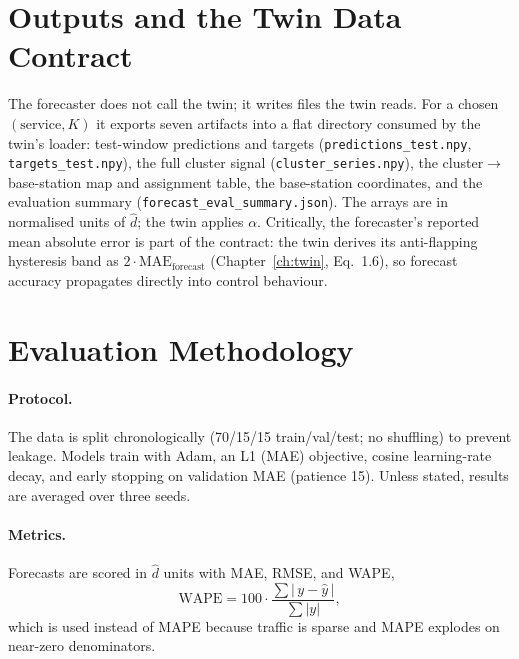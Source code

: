 \section{Outputs and the Twin Data Contract}
\label{sec:fc-contract}

{\sloppy The forecaster does not call the twin; it writes files the twin reads. For a chosen
$(\text{service},K)$ it exports seven artifacts into a flat directory consumed by the twin's
loader: test-window predictions and targets (\texttt{predictions\_test.npy},
\texttt{targets\_test.npy}), the full cluster signal (\texttt{cluster\_series.npy}), the
cluster$\rightarrow$base-station map and assignment table, the base-station coordinates, and the
evaluation summary (\texttt{forecast\_eval\_summary.json}). The arrays are in normalised
units of $\hat d$; the twin applies $\alpha$. Critically, the forecaster's reported mean absolute
error is part of the contract: the twin derives its anti-flapping hysteresis band as
$2\cdot\mathrm{MAE}_\text{forecast}$ (Chapter~\ref{ch:twin}, Eq.~1.6), so forecast accuracy
propagates directly into control behaviour.\par}

\section{Evaluation Methodology}
\label{sec:fc-method}

\paragraph{Protocol.} The data is split chronologically (70/15/15 train/val/test; no shuffling)
to prevent leakage. Models train with Adam, an L1 (MAE) objective, cosine learning-rate decay, and
early stopping on validation MAE (patience 15). Unless stated, results are averaged over three
seeds.

\paragraph{Metrics.} Forecasts are scored in $\hat d$ units with MAE, RMSE, and WAPE,
\begin{equation}
  \mathrm{WAPE} = 100\cdot\frac{\sum|\,y-\hat y\,|}{\sum|y|},
\end{equation}
which is used instead of MAPE because traffic is sparse and MAPE explodes on near-zero
denominators.


